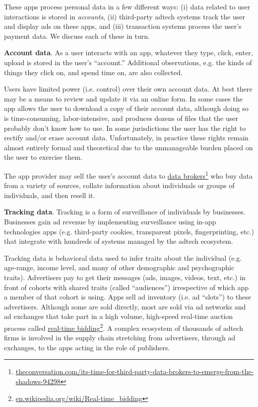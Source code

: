 \documentclass[11pt, oneside]{article}   	%
\newcommand{\hyperfootnote}[1][]{\def\ArgI{{#1}}\hyperfootnoteRelay}
\newcommand\hyperfootnoteRelay[2][]{\href{#1#2}{\ArgI}\footnote{\href{#1#2}{#2}}}
\begin{document}
These apps process personal data in a few different ways: (i) data related to user interactions is stored in \emph{accounts}, (ii) third-party adtech systems track the user and display ads on these apps, and (iii) transaction systems process the user's payment data. We discuss each of these in turn.

\textbf{Account data}. As a user interacts with an app, whatever they type, click, enter, upload is stored in the user's ``account.'' Additional observations, e.g. the kinds of things they click on, and spend time on, are also collected. 

Users have limited power (i.e. control) over their own account data. At best there may be a means to review and update it via an online form. In some cases the app allows the user to download a copy of their account data, although doing so is time-consuming, labor-intensive, and produces dozens of files that the user probably don't know how to use. In some jurisdictions the user has the right to rectify and/or erase account data. Unfortunately, in practice these rights remain almost entirely formal and theoretical due to the unmanageable burden placed on the user to exercise them. 

The app provider may sell the user's account data to \hyperfootnote[data brokers][https://]{theconversation.com/its-time-for-third-party-data-brokers-to-emerge-from-the-shadows-94298} who buy data from a variety of sources, collate information about individuals or groups of individuals, and then resell it.

\textbf{Tracking data}. Tracking is a form of surveillance of individuals by businesses. Businesses gain ad revenue by implementing surveillance using in-app technologies apps (e.g. third-party cookies, transparent pixels, fingerprinting, etc.) that integrate with hundreds of systems managed by the adtech ecosystem.

Tracking data is behavioral data used to infer traits about the individual (e.g. age-range, income level, and many of other demographic and psychographic traits). Advertisers pay to get their messages (ads, images, videos, text, etc.) in front of cohorts with shared traits (called ``audiences'') irrespective of which app a member of that cohort is using. Apps sell ad inventory (i.e. ad ``slots'') to these advertisers. Although some are sold directly, most are sold via ad networks and ad exchanges that take part in a high volume, high-speed real-time auction process called \hyperfootnote[real-time bidding][https://]{en.wikipedia.org/wiki/Real-time\_bidding}. A complex ecosystem of thousands of adtech firms is involved in the supply chain stretching from advertisers, through ad exchanges, to the apps acting in the role of publishers. 
\end{document}
